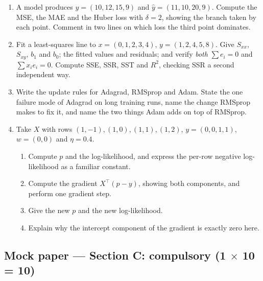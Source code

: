 \documentclass[11pt,a4paper]{article}
\begin{document}
\begin{enumerate}[label=\textbf{\arabic*.}, leftmargin=*, start=6]
  \item A model produces $y = (10, 12, 15, 9)$ and
    $\hat{y} = (11, 10, 20, 9)$. Compute the MSE, the MAE and the Huber loss
    with $\delta = 2$, showing the branch taken by each point. Comment in two
    lines on which loss the third point dominates. 
  \item Fit a least-squares line to $x = (0,1,2,3,4)$, $y = (1,2,4,5,8)$.
    Give $S_{xx}$, $S_{xy}$, $b_1$ and $b_0$; the fitted values and residuals;
    and verify \emph{both} $\sum e_i = 0$ and $\sum x_ie_i = 0$. Compute SSE,
    SSR, SST and $R^2$, checking SSR a second independent way. 
  \item Write the update rules for Adagrad, RMSprop and Adam. State the one
    failure mode of Adagrad on long training runs, name the change RMSprop
    makes to fix it, and name the two things Adam adds on top of RMSprop.
  \item Take $X$ with rows $(1,-1), (1,0), (1,1), (1,2)$, $y = (0,0,1,1)$,
    $w = (0,0)$ and $\eta = 0.4$.
    \begin{enumerate}[label=(\alph*), leftmargin=*]
      \item Compute $p$ and the log-likelihood, and express the per-row
        negative log-likelihood as a familiar constant. 
      \item Compute the gradient $X^\top(p-y)$, showing both components, and
        perform one gradient step. 
      \item Give the new $p$ and the new log-likelihood. 
      \item Explain why the intercept component of the gradient is exactly
        zero here. 
    \end{enumerate}
\end{enumerate}

\subsection*{Mock paper --- Section C: compulsory \quad (1 $\times$ 10 = 10)}
\end{document}
